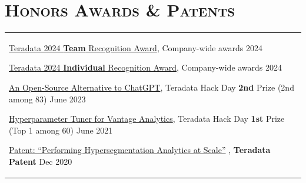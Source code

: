 \documentclass[letterpaper,11pt]{article} %
\begin{document}


\section{\Large\bf\textsc{Honors Awards \& Patents}}
\begin{tabular}{p{18.5cm}}
\href{}{Teradata 2024 \textbf{Team} Recognition Award}, {{Company-wide awards}} \hfill 2024
\vspace{.1mm}

\href{}{Teradata 2024 \textbf{Individual} Recognition Award}, {{Company-wide awards}} \hfill 2024
 \vspace{.1mm}

\href{}{An Open-Source Alternative to ChatGPT}, {{Teradata Hack Day \textbf {2nd} Prize (2nd among 83)}} \hfill June 2023
 \vspace{.1mm}
 
\href{}{Hyperparameter Tuner for Vantage Analytics}, {{Teradata Hack Day \textbf {1st} Prize} (Top 1 among 60)} \hfill June 2021
 \vspace{.1mm}
 
 \href{}{Patent: “Performing Hypersegmentation Analytics at Scale”} , {\textbf{Teradata Patent}} \hfill Dec 2020
 \vspace{.1mm}





\end{tabular}
\end{document}
